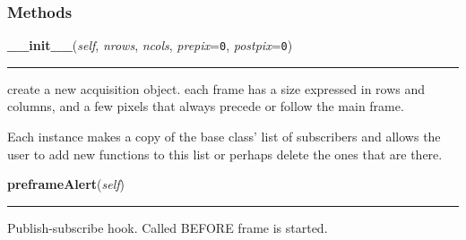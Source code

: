 
  \subsubsection{Methods}

    \label{ociw:RawFrame:__init__}

    \vspace{0.5ex}

    \begin{boxedminipage}{\textwidth}

    \raggedright \textbf{\_\_init\_\_}(\textit{self}, \textit{nrows}, \textit{ncols}, \textit{prepix}=\texttt{0}, \textit{postpix}=\texttt{0})

    \vspace{-1.5ex}

    \rule{\textwidth}{0.5\fboxrule}
    create a new acquisition object. each frame has a size expressed in 
    rows and columns, and a few pixels that always precede or follow the 
    main frame.

    Each instance makes a copy of the base class' list of subscribers and 
    allows the user to add new functions to this list or perhaps delete the
    ones that are there.

    \vspace{1ex}

    \end{boxedminipage}

    \label{ociw:RawFrame:preframeAlert}

    \vspace{0.5ex}

    \begin{boxedminipage}{\textwidth}

    \raggedright \textbf{preframeAlert}(\textit{self})

    \vspace{-1.5ex}

    \rule{\textwidth}{0.5\fboxrule}
    Publish-subscribe hook. Called BEFORE frame is started.

    \vspace{1ex}

    \end{boxedminipage}

